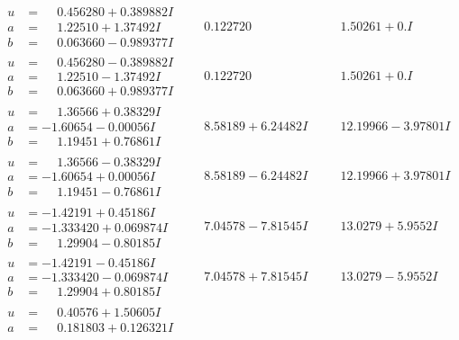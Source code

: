 \documentclass[1p]{elsarticle_modified}
\theoremstyle{definition}
\begin{document}
$$\begin{array}{c|c|c}
\begin{aligned}
u &= \phantom{-}0.456280 + 0.389882 I \\
a &= \phantom{-}1.22510 + 1.37492 I \\
b &= \phantom{-}0.063660 - 0.989377 I\end{aligned}
 & \phantom{-}0.122720\phantom{ +0.000000I} & \phantom{-}1.50261 + 0. I\phantom{ +0.000000I} \\ \hline\begin{aligned}
u &= \phantom{-}0.456280 - 0.389882 I \\
a &= \phantom{-}1.22510 - 1.37492 I \\
b &= \phantom{-}0.063660 + 0.989377 I\end{aligned}
 & \phantom{-}0.122720\phantom{ +0.000000I} & \phantom{-}1.50261 + 0. I\phantom{ +0.000000I} \\ \hline\begin{aligned}
u &= \phantom{-}1.36566 + 0.38329 I \\
a &= -1.60654 - 0.00056 I \\
b &= \phantom{-}1.19451 + 0.76861 I\end{aligned}
 & \phantom{-}8.58189 + 6.24482 I & \phantom{-}12.19966 - 3.97801 I \\ \hline\begin{aligned}
u &= \phantom{-}1.36566 - 0.38329 I \\
a &= -1.60654 + 0.00056 I \\
b &= \phantom{-}1.19451 - 0.76861 I\end{aligned}
 & \phantom{-}8.58189 - 6.24482 I & \phantom{-}12.19966 + 3.97801 I \\ \hline\begin{aligned}
u &= -1.42191 + 0.45186 I \\
a &= -1.333420 + 0.069874 I \\
b &= \phantom{-}1.29904 - 0.80185 I\end{aligned}
 & \phantom{-}7.04578 - 7.81545 I & \phantom{-}13.0279 + 5.9552 I \\ \hline\begin{aligned}
u &= -1.42191 - 0.45186 I \\
a &= -1.333420 - 0.069874 I \\
b &= \phantom{-}1.29904 + 0.80185 I\end{aligned}
 & \phantom{-}7.04578 + 7.81545 I & \phantom{-}13.0279 - 5.9552 I \\ \hline\begin{aligned}
u &= \phantom{-}0.40576 + 1.50605 I \\
a &= \phantom{-}0.181803 + 0.126321 I \\

\end{aligned}
\end{array}$$
\end{document}

